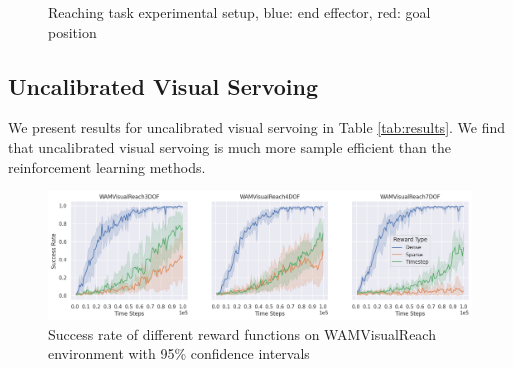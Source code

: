 \documentclass[letterpaper, 10 pt, conference]{ieeeconf}  %
\begin{document}
\begin{figure}[thpb]
    \centering
    \qquad
    \caption{Reaching task experimental setup, blue: end effector, red: goal position}
    \label{figure_experimental_setup}
\end{figure}

\subsection{Uncalibrated Visual Servoing}

We present results for uncalibrated visual servoing in Table \ref{tab:results}. We find that uncalibrated visual servoing is
much more sample efficient than the reinforcement learning methods.

\begin{figure}[thpb]
    \centering
    \includegraphics[width=\linewidth]{successes.reward_type.timesteps.png}
    \caption{Success rate of different reward functions on WAMVisualReach environment with 95\% confidence intervals}
    \label{fig:figure_reward_functions}
\end{figure}
\end{document}
